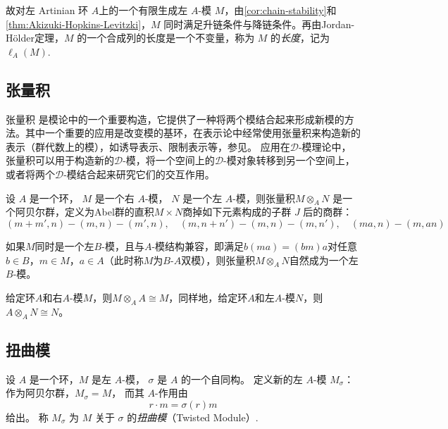 故对左 Artinian 环 $A$上的一个有限生成左 $A$-模 $M$，由\ref{cor:chain-stability}和 \ref{thm:Akizuki-Hopkins-Levitzki}，$M$ 同时满足升链条件与降链条件。再由Jordan-Hölder定理，$M$ 的一个合成列的长度是一个不变量，称为 $M$ 的\emph{长度}，记为 $\ell_A(M)$.


\subsection{张量积}
张量积 是模论中的一个重要构造，它提供了一种将两个模结合起来形成新模的方法。其中一个重要的应用是改变模的基环，在表示论中经常使用张量积来构造新的表示（群代数上的模），如诱导表示、限制表示等，参见\cite{serre1977linear}。
应用在$\mathcal{D}$-模理论中，张量积可以用于构造新的$\mathcal{D}$-模，将一个空间上的$\mathcal{D}$-模对象转移到另一个空间上，或者将两个$\mathcal{D}$-模结合起来研究它们的交互作用。



\begin{definition}
    设 $A$ 是一个环， $M$ 是一个右 $A$-模， $N$ 是一个左 $A$-模，则张量积$M\otimes_A N$ 是一个阿贝尔群，定义为Abel群的直积$M\times N$商掉如下元素构成的子群 $J$ 后的商群：
    \begin{equation*}
        (m+m',n)-(m,n)-(m',n),\quad (m,n+n')-(m,n)-(m,n'),\quad (ma,n)-(m,an)
    \end{equation*}
\end{definition}
\begin{remark}
    如果$M$同时是一个左$B$-模，且与$A$-模结构兼容，即满足$b(ma)=(bm)a$对任意$b\in B$，$m\in M$，$a\in A$（此时称$M$为$B$-$A$双模），则张量积$M\otimes_A N$自然成为一个左$B$-模。
\end{remark}

\begin{example}
    给定环$A$和右$A$-模$M$，则$M\otimes_A A\cong M$，同样地，给定环$A$和左$A$-模$N$，则$A\otimes_A N\cong N$。
\end{example}



\subsection{扭曲模}

\begin{definition}
    设 $A$ 是一个环，$M$ 是左 $A$-模，
    $\sigma$ 是 $A$ 的一个自同构。
    定义新的左 $A$-模 $M_\sigma$：
    作为阿贝尔群，$M_\sigma=M$，
    而其 $A$-作用由
    \[
        r\cdot m=\sigma(r)m
    \]
    给出。
    称 $M_\sigma$ 为 $M$ 关于 $\sigma$ 的\emph{扭曲模}（Twisted Module）.
\end{definition}

